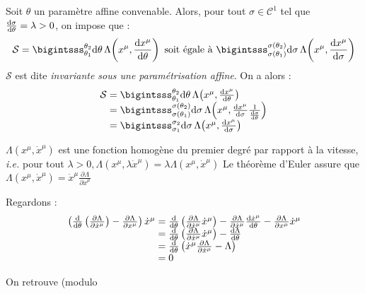 Soit $\theta$ un paramètre affine convenable. Alors, pour tout $\sigma \in \mathcal{C}^1$ tel que $\frac{\mathrm{d}\sigma}{\mathrm{d}\theta}=\lambda>0$, on impose que :
$$
	\mathcal{S}=\bigintsss_{\theta_1}^{\theta_2}\dif\theta\,\Lambda\!\left(x^\mu,\frac{\dif x^\mu}{\dif\theta}\right) \text{ soit égale à } \bigintsss_{\sigma(\theta_1)}^{\sigma(\theta_2)}\dif\sigma\,\Lambda\!\left(x^\mu,\frac{\dif x^\mu}{\dif\sigma}\right) 
$$
$\mathcal{S}$ est dite \emph{invariante sous une paramétrisation affine}. On a alors :
$$
	\begin{array}{r@{\;}l}
		\mathcal{S}&=\bigintsss_{\theta_1}^{\theta_2}\dif\theta\,\Lambda\!\left(x^\mu,\frac{\dif x^\mu}{\dif\theta}\right)\\
			&=\bigintsss_{\sigma(\theta_1)}^{\sigma(\theta_2)}\dif\sigma\,\Lambda\!\left(x^\mu,\frac{\dif x^\mu}{\dif\sigma}\frac{1}{\frac{\dif\sigma}{\dif\theta}}\right)\\
			&=\bigintsss_{\sigma_1}^{\sigma_2}\dif\sigma\,\Lambda\!\left(x^\mu,\frac{\dif x^\mu}{\dif\sigma}\right)
	\end{array}
$$

$ \Lambda(x^\mu,\dot{x}^\mu)$ est une fonction homogène du premier degré par rapport à la vitesse, \emph{i.e.} pour tout $\lambda>0, \Lambda(x^\mu,\lambda\dot{x}^\mu)=\lambda\Lambda(x^\mu,\dot{x}^\mu)$
Le théorème d'Euler assure que $\Lambda(x^\mu,\dot{x}^\mu)=\dot{x}^\mu\frac{\partial\Lambda}{\partial\dot{x}^\mu}$

Regardons :
$$
	\begin{array}{l@{\;}l}
		\left(\frac{\dif}{\dif\theta}\left(\frac{\partial\Lambda}{\partial\dot{x}^\mu}\right)-\frac{\partial\Lambda}{\partial x^\mu}\right)\dot{x}^\mu&= \frac{\dif}{\dif \theta}\left(\frac{\partial\Lambda}{\partial\dot{x}^\mu}\dot{x}^\mu\right)-\frac{\partial \Lambda}{\partial \dot{x}^\mu}\frac{\dif \dot{x}^\mu}{\dif\theta}-\frac{\partial \Lambda}{\partial x^\mu}\dot{x}^\mu\\
			&=\frac{\dif}{\dif\theta}\left(\frac{\partial\Lambda}{\partial\dot{x}^\mu}\dot{x}^\mu\right)-\frac{\dif\Lambda}{\dif \theta}\\
			&=\frac{\dif}{\dif\theta}\left(\dot{x}^\mu\frac{\partial \Lambda}{\partial \dot{x}^\mu}-\Lambda\right)\\
			&=0
	\end{array}
$$

\begin{conc}
	On retrouve (modulo 
\end{conc}